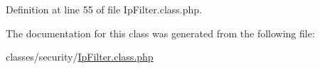 Definition at line 55 of file Ip\+Filter.\+class.\+php.



The documentation for this class was generated from the following file\+:\begin{DoxyCompactItemize}
\item 
classes/security/\hyperlink{IpFilter_8class_8php}{Ip\+Filter.\+class.\+php}\end{DoxyCompactItemize}

